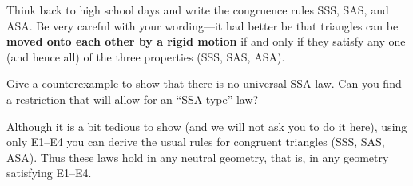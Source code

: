 \documentclass{ximera}
\begin{document}
\begin{exploration}
Think back to high school days and write the congruence rules SSS,
SAS, and ASA. Be very careful with your wording---it had better be
that triangles can be \textbf{moved onto each other by a rigid motion}
if and only if they satisfy any one (and hence all) of the three
properties (SSS, SAS, ASA).
\begin{solution}
\end{solution}
\end{exploration}

\begin{question}
Give a counterexample to show that there is no universal SSA law.  Can
you find a restriction that will allow for an ``SSA-type'' law?
\end{question}

Although it is a bit tedious to show (and we will not ask you to do it
here), using only E1--E4 you can derive the usual rules for congruent
triangles (SSS, SAS, ASA). Thus these laws hold in any neutral
geometry, that is, in any geometry satisfying E1--E4.
\end{document}
